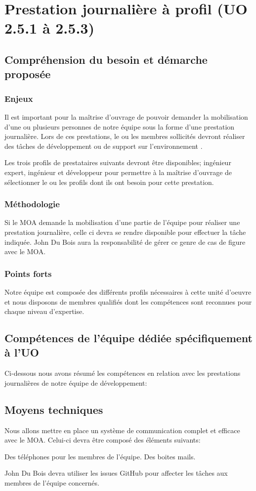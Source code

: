 	\section{Prestation journalière à profil (UO 2.5.1 à 2.5.3)}
		\subsection{Compréhension du besoin et démarche proposée}
		\subsubsection{Enjeux}		
		Il est important pour la maîtrise d’ouvrage de pouvoir demander la mobilisation d’une ou plusieurs personnes de notre équipe sous la forme d’une prestation journalière. Lors de ces prestations, le ou les membres sollicités devront réaliser des tâches de développement ou de support sur l’environnement \correlyce{}.
		
		Les trois profils de prestataires suivants devront être disponibles; ingénieur expert, ingénieur et développeur pour permettre à la maîtrise d’ouvrage de sélectionner le ou les profils dont ils ont besoin pour cette prestation. 
		
		\subsubsection{Méthodologie}	
		Si le MOA demande la mobilisation d’une partie de l’équipe pour réaliser une prestation journalière, celle ci devra se rendre disponible pour effectuer la tâche indiquée. John Du Bois aura la responsabilité de gérer ce genre de cas de figure avec le MOA.
		
		\subsubsection{Points forts}
		Notre équipe est composée des différents profils nécessaires à cette unité d’oeuvre et nous disposons de membres qualifiés dont les compétences sont reconnues pour chaque niveau d’expertise.
		
		\subsection{Compétences de l'équipe dédiée spécifiquement à l'UO}	
		Ci-dessous nous avons résumé les compétences en relation avec les prestations journalières de notre équipe de développement:
		
		
		\subsection{Moyens techniques}
		Nous allons mettre en place un système de communication complet et efficace avec le MOA. Celui-ci devra être composé des éléments suivants:
		
		Des téléphones pour les membres de l’équipe.
		Des boites mails.
		
		John Du Bois devra utiliser les issues GitHub pour affecter les tâches aux membres de l’équipe concernés. 
		
		
